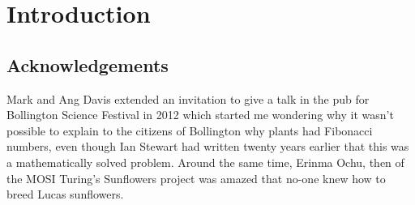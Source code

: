\documentclass[a4paper,10pt]{memoir}
\begin{document}


\begin{KeepFromToc}	\tableofcontents\end{KeepFromToc} 
\part{Introduction}

\cite{swintonNovelFibonacciNonFibonacci2016}
\cite{theophrastusEnquiryPlantsBook1916}
\cite{thompsonGrowthForm1917}
\cite{traasPhyllotaxis2013}
\cite{cookCurvesLife1914}
\chapter*{Acknowledgements}
Mark and Ang Davis extended an invitation to give a talk in the pub for Bollington Science Festival in 2012 which started me wondering why it wasn't possible to explain to the citizens of Bollington why plants had Fibonacci numbers, even though Ian Stewart had written twenty years earlier that this was a mathematically solved problem. Around the same time, Erinma Ochu, then of the MOSI Turing's Sunflowers project was amazed that no-one knew how to breed Lucas sunflowers. 

\jBookEndSolutions %

\jBibliography

\end{document}
